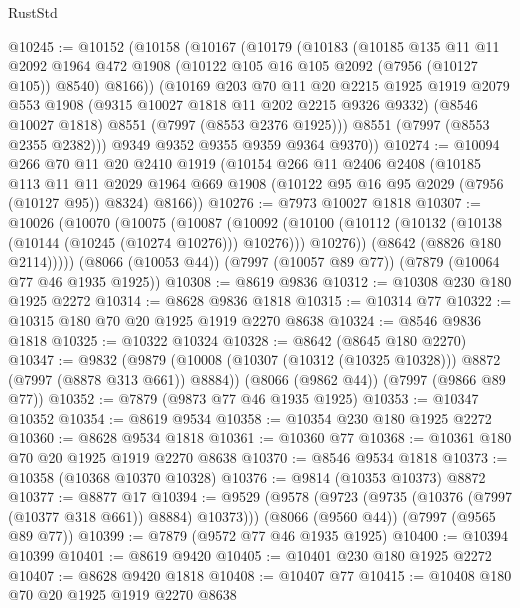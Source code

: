 \begin{lexlean}{RustStd}
\begin{coremodule}
@10245 := @10152
    (@10158
      (@10167
        (@10179
          (@10183
            (@10185
              @135
              @11
              @11
              @2092
              @1964
              @472
              @1908
              (@10122 @105 @16 @105 @2092 (@7956 (@10127 @105)) @8540)
              @8166))
          (@10169
            @203
            @70
            @11
            @20
            @2215
            @1925
            @1919
            @2079
            @553
            @1908
            (@9315 @10027 @1818 @11 @202 @2215 @9326 @9332)
            (@8546 @10027 @1818)
            @8551
            (@7997 (@8553 @2376 @1925)))
          @8551
          (@7997 (@8553 @2355 @2382)))
        @9349
        @9352
        @9355
        @9359
        @9364
        @9370))
@10274 := @10094
    @266
    @70
    @11
    @20
    @2410
    @1919
    (@10154
      @266
      @11
      @2406
      @2408
      (@10185
        @113
        @11
        @11
        @2029
        @1964
        @669
        @1908
        (@10122 @95 @16 @95 @2029 (@7956 (@10127 @95)) @8324)
        @8166))
@10276 := @7973 @10027 @1818
@10307 := @10026
    (@10070
      (@10075
        (@10087
          (@10092
            (@10100 (@10112 (@10132 (@10138 (@10144 (@10245 (@10274 @10276))) @10276))) @10276))
          (@8642 (@8826 @180 @2114)))))
    (@8066 (@10053 @44))
    (@7997 (@10057 @89 @77))
    (@7879 (@10064 @77 @46 @1935 @1925))
@10308 := @8619 @9836
@10312 := @10308 @230 @180 @1925 @2272
@10314 := @8628 @9836 @1818
@10315 := @10314 @77
@10322 := @10315 @180 @70 @20 @1925 @1919 @2270 @8638
@10324 := @8546 @9836 @1818
@10325 := @10322 @10324
@10328 := @8642 (@8645 @180 @2270)
@10347 := @9832
    (@9879 (@10008 (@10307 (@10312 (@10325 @10328))) @8872 (@7997 (@8878 @313 @661)) @8884))
    (@8066 (@9862 @44))
    (@7997 (@9866 @89 @77))
@10352 := @7879 (@9873 @77 @46 @1935 @1925)
@10353 := @10347 @10352
@10354 := @8619 @9534
@10358 := @10354 @230 @180 @1925 @2272
@10360 := @8628 @9534 @1818
@10361 := @10360 @77
@10368 := @10361 @180 @70 @20 @1925 @1919 @2270 @8638
@10370 := @8546 @9534 @1818
@10373 := @10358 (@10368 @10370 @10328)
@10376 := @9814 (@10353 @10373) @8872
@10377 := @8877 @17
@10394 := @9529
    (@9578 (@9723 (@9735 (@10376 (@7997 (@10377 @318 @661)) @8884) @10373)))
    (@8066 (@9560 @44))
    (@7997 (@9565 @89 @77))
@10399 := @7879 (@9572 @77 @46 @1935 @1925)
@10400 := @10394 @10399
@10401 := @8619 @9420
@10405 := @10401 @230 @180 @1925 @2272
@10407 := @8628 @9420 @1818
@10408 := @10407 @77
@10415 := @10408 @180 @70 @20 @1925 @1919 @2270 @8638

\end{coremodule}
\end{lexlean}
